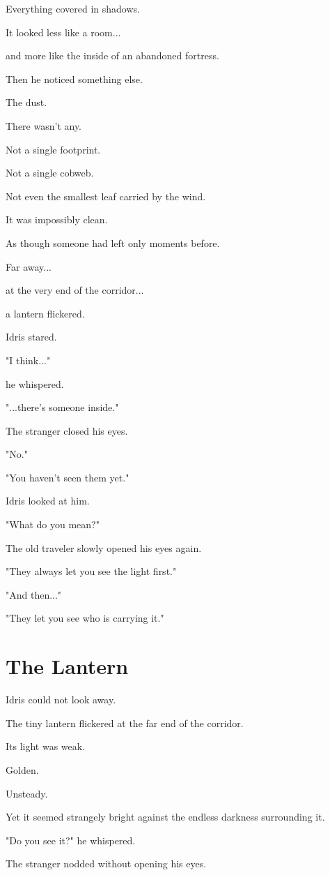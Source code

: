 \documentclass[12pt,openany]{book}
\begin{document}
Everything covered in shadows.

It looked less like a room...

and more like the inside of an abandoned fortress.

Then he noticed something else.

The dust.

There wasn't any.

Not a single footprint.

Not a single cobweb.

Not even the smallest leaf carried by the wind.

It was impossibly clean.

As though someone had left only moments before.

Far away...

at the very end of the corridor...

a lantern flickered.

Idris stared.

"I think..."

he whispered.

"...there's someone inside."

The stranger closed his eyes.

"No."

"You haven't seen them yet."

Idris looked at him.

"What do you mean?"

The old traveler slowly opened his eyes again.

"They always let you see the light first."

"And then..."

"They let you see who is carrying it."
\section*{The Lantern}

Idris could not look away.

The tiny lantern flickered at the far end of the corridor.

Its light was weak.

Golden.

Unsteady.

Yet it seemed strangely bright against the endless darkness surrounding it.

"Do you see it?" he whispered.

The stranger nodded without opening his eyes.
\end{document}
